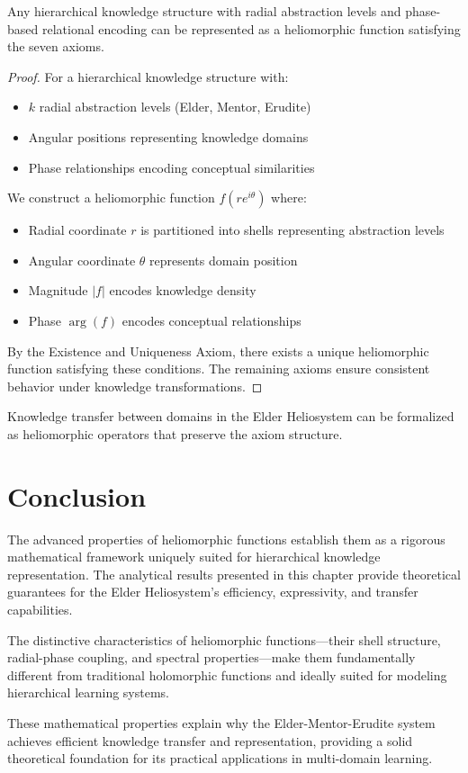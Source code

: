 \begin{theorem}
Any hierarchical knowledge structure with radial abstraction levels and phase-based relational encoding can be represented as a heliomorphic function satisfying the seven axioms.
\end{theorem}

\begin{proof}
For a hierarchical knowledge structure with:
\begin{itemize}
    \item $k$ radial abstraction levels (Elder, Mentor, Erudite)
    \item Angular positions representing knowledge domains
    \item Phase relationships encoding conceptual similarities
\end{itemize}

We construct a heliomorphic function $f(re^{i\theta})$ where:
\begin{itemize}
    \item Radial coordinate $r$ is partitioned into shells representing abstraction levels
    \item Angular coordinate $\theta$ represents domain position
    \item Magnitude $|f|$ encodes knowledge density
    \item Phase $\arg(f)$ encodes conceptual relationships
\end{itemize}

By the Existence and Uniqueness Axiom, there exists a unique heliomorphic function satisfying these conditions. The remaining axioms ensure consistent behavior under knowledge transformations.
\end{proof}

\begin{corollary}
Knowledge transfer between domains in the Elder Heliosystem can be formalized as heliomorphic operators that preserve the axiom structure.
\end{corollary}

\section{Conclusion}

The advanced properties of heliomorphic functions establish them as a rigorous mathematical framework uniquely suited for hierarchical knowledge representation. The analytical results presented in this chapter provide theoretical guarantees for the Elder Heliosystem's efficiency, expressivity, and transfer capabilities.

The distinctive characteristics of heliomorphic functions—their shell structure, radial-phase coupling, and spectral properties—make them fundamentally different from traditional holomorphic functions and ideally suited for modeling hierarchical learning systems.

These mathematical properties explain why the Elder-Mentor-Erudite system achieves efficient knowledge transfer and representation, providing a solid theoretical foundation for its practical applications in multi-domain learning.